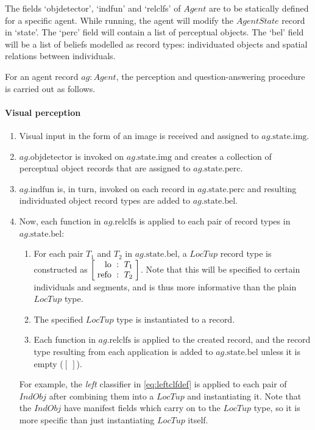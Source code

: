 The fields `objdetector', `indfun' and `relclfs' of $Agent$ are to be statically defined for a specific agent.
While running, the agent will modify the $AgentState$ record in `state'.
The `perc' field will contain a list of perceptual objects.
The `bel' field will be a list of beliefs modelled as record types:
individuated objects and spatial relations between individuals.

For an agent record $ag : Agent$, the perception and question-answering procedure is carried out as follows.

\paragraph{Visual perception}

\begin{enumerate}
\item Visual input in the form of an image is received and assigned to $ag.\text{state}.\text{img}$.
\item $ag.\text{objdetector}$ is invoked on $ag.\text{state.img}$ and creates a collection of perceptual object records that are assigned to $ag.\text{state}.\text{perc}$.
\item $ag.\text{indfun}$ is, in turn, invoked on each record in $ag.\text{state.perc}$ and resulting individuated object record types are added to $ag.\text{state.bel}$.
\item Now, each function in $ag.\text{relclfs}$ is applied to each pair of record types in $ag.\text{state.bel}$:
	\begin{enumerate}
    \item For each pair $T_1$ and $T_2$ in $ag.\text{state.bel}$, a $LocTup$ record type is constructed as $\rec{\text{lo} &:& T_1 \\ \text{refo} &:& T_2}$.
    Note that this will be specified to certain individuals and segments, and is thus more informative than the plain $LocTup$ type.
    \item The specified $LocTup$ type is instantiated to a record.
	\item Each function in $ag.\text{relclfs}$ is applied to the created record, and the record type resulting from each application is added to $ag.\text{state.bel}$ unless it is empty ($[\:]$).
	\end{enumerate}
	For example, the \textit{left} classifier in \autoref{eq:leftclfdef} is applied to each pair of $IndObj$ after combining them into a $LocTup$ and instantiating it.
    Note that the $IndObj$ have manifest fields which carry on to the $LocTup$ type, so it is more specific than just instantiating $LocTup$ itself.
\end{enumerate}


